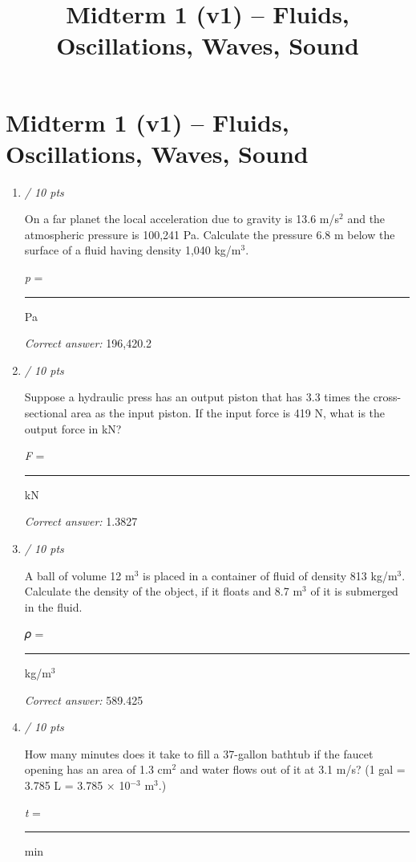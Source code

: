 \documentclass[11pt]{article}
\title{Midterm 1 (v1) -- Fluids, Oscillations, Waves, Sound}
\author{}
\date{}
\begin{document}
\maketitle

\section*{Midterm 1 (v1) -- Fluids, Oscillations, Waves, Sound}

\begin{enumerate}[leftmargin=*,label=\textbf{Question \arabic*.}]
\item \hfill \textit{/ 10 pts}

On a far planet the local acceleration due to gravity is 13.6 m/s$^{2}$ and the atmospheric pressure is 100,241 Pa. Calculate the pressure 6.8 m below the surface of a fluid having density 1,040 kg/m$^{3}$.



\emph{p} = \rule{2cm}{0.4pt} Pa

\textit{Correct answer: } 196,420.2

\item \hfill \textit{/ 10 pts}

Suppose a hydraulic press has an output piston that has 3.3 times the cross-sectional area as the input piston. If the input force is 419 N, what is the output force in kN?



\emph{F} = \rule{2cm}{0.4pt} kN

\textit{Correct answer: } 1.3827

\item \hfill \textit{/ 10 pts}

A ball of volume 12 m$^{3}$ is placed in a container of fluid of density 813 kg/m$^{3}$. Calculate the density of the object, if it floats and 8.7 m$^{3}$ of it is submerged in the fluid.



𝜌 = \rule{2cm}{0.4pt} kg/m$^{3}$

\textit{Correct answer: } 589.425

\item \hfill \textit{/ 10 pts}

How many minutes does it take to fill a 37-gallon bathtub if the faucet opening has an area of 1.3 cm$^{2}$ and water flows out of it at 3.1 m/s? (1 gal = 3.785 L = 3.785 × 10$^{-3}$ m$^{3}$.)



\emph{t} = \rule{2cm}{0.4pt} min


\end{enumerate}
\end{document}
